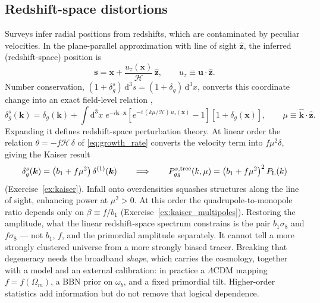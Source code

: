 \documentclass[a4paper,11pt]{article}
\newcommand{\vx}{\bm{x}}
\newcommand{\vsv}{\bm{s}}
\newcommand{\vk}{\bm{k}}
\newcommand{\vu}{\bm{u}}
\newcommand{\nhat}{\hat{\bm{z}}}
\newcommand{\khat}{\hat{\bm{k}}}
\def\cH{\mathcal{H}}
\def\Plin{P_{\rm L}}
\newcommand{\dd}{\mathrm{d}}
\def\lcdm{$\Lambda$CDM}
\def\Om{\Omega_m}
\numberwithin{equation}{section}
\begin{document}
\subsection{Redshift-space distortions}
\label{sec:rsd}

Surveys infer radial positions from redshifts, which are contaminated by peculiar velocities. In the plane-parallel approximation with line of sight $\nhat$, the inferred (redshift-space) position is
\begin{equation}
\vsv = \vx + \frac{u_z(\vx)}{\cH}\,\nhat ,
\qquad u_z \equiv \vu\cdot\nhat .
\label{eq:rsd_map}
\end{equation}
Number conservation, $(1+\delta_g^s)\,\dd^3s = (1+\delta_g)\,\dd^3x$, converts this coordinate change into an exact field-level relation \cite{ChudaykinIvanov2019},
\begin{equation}
\delta_g^s(\vk) = \delta_g(\vk)
+ \int \dd^3x\; e^{-i\vk\cdot\vx}
\left[e^{-i\,(k\mu/\cH)\,u_z(\vx)} - 1\right]\left[1+\delta_g(\vx)\right],
\qquad
\mu \equiv \khat\cdot\nhat .
\label{eq:rsd_exact}
\end{equation}
Expanding it defines redshift-space perturbation theory. At linear order the relation $\theta = -f\cH\,\delta$ of \eqref{eq:growth_rate} converts the velocity term into $f\mu^2\delta$, giving the Kaiser result \cite{Kaiser1987}
\begin{equation}
\delta_g^s(\vk) = \left(b_1 + f\mu^2\right)\delta^{(1)}(\vk)
\qquad\Longrightarrow\qquad
P_{gg}^{s,\rm tree}(k,\mu) = \left(b_1 + f\mu^2\right)^2\Plin(k)
\label{eq:kaiser}
\end{equation}
(Exercise~\ref{ex:kaiser}). Infall onto overdensities squashes structures along the line of sight, enhancing power at $\mu^2 > 0$. At this order the quadrupole-to-monopole ratio depends only on $\beta \equiv f/b_1$ (Exercise~\ref{ex:kaiser_multipoles}). Restoring the amplitude, what the linear redshift-space spectrum constrains is the pair $b_1\sigma_8$ and $f\sigma_8$ --- not $b_1$, $f$, and the primordial amplitude separately. It cannot tell a more strongly clustered universe from a more strongly biased tracer. Breaking that degeneracy needs the broadband \emph{shape}, which carries the cosmology, together with a model and an external calibration: in practice a \lcdm{} mapping $f = f(\Om)$, a BBN prior on $\omega_b$, and a fixed primordial tilt. Higher-order statistics add information but do not remove that logical dependence.
\end{document}
